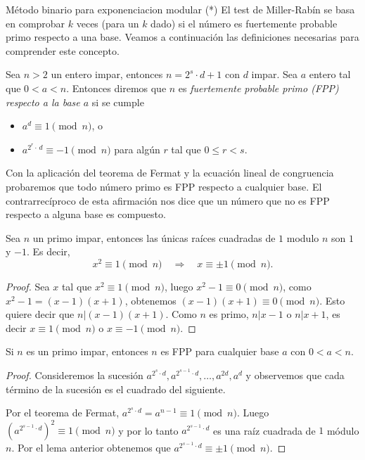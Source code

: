 \begin{section}{Método binario para exponenciacion modular (*)}
El test de  Miller-Rabín se basa en comprobar $k$ veces (para un $k$ dado) si el número es fuertemente probable primo respecto a una base. Veamos a continuación las definiciones necesarias para comprender este concepto. 

\begin{definicion}
    Sea $n > 2$ un entero impar, entonces $n = 2^s \cdot d + 1$ con $d$ impar. Sea $a$ entero  tal que $0 < a < n$. Entonces diremos que $n$ es \textit{fuertemente probable primo (FPP) respecto a la base $a$} si se cumple
    \begin{itemize}
        \item $a^{d} \equiv 1 \pmod{n}$, o
        \item $a^{2^r\cdot\, d} \equiv -1 \pmod{n}$  para algún $r$ tal que $0 \le r < s$.
    \end{itemize}
\end{definicion}

Con la aplicación del teorema de Fermat y la ecuación lineal de congruencia probaremos  que todo número primo es FPP respecto a cualquier base. El contrarrecíproco de esta afirmación nos dice que un número que no es FPP respecto a alguna base es compuesto.

\begin{lema}
    Sea $n$  un primo impar, entonces las únicas raíces cuadradas de $1$ modulo $n$ son $1$ y $-1$. Es decir, 
    $$
    x^2 \equiv 1 \pmod{n}  \quad \Rightarrow\quad x \equiv \pm 1 \pmod{n}.
    $$
\end{lema}
\begin{proof}
    Sea $x$ tal que $x^2 \equiv 1 \pmod{n}$, luego $x^2 - 1 \equiv 0 \pmod{n}$, como $x^2 -1 = (x-1)(x+1)$, obtenemos  $(x-1)(x+1) \equiv 0 \pmod{n}$. Esto quiere decir  que $n|  (x-1)(x+1)$. Como $n$  es primo, $n | x -1$ o $n| x +1$, es decir $x  \equiv 1 \pmod{n}$  o $x  \equiv -1 \pmod{n}$.
\end{proof}

\begin{teorema}
    Si $n$ es un primo impar, entonces $n$ es FPP para cualquier base  $a$ con $0 < a < n$.
\end{teorema}
\begin{proof}
    Consideremos la sucesión $a^{2^s \cdot d}, a^{2^{s-1} \cdot d}, \dots, a^{2d}, a^d$ y  observemos que cada término de la sucesión es el cuadrado del siguiente.

     Por el teorema de Fermat,  $a^{2^s \cdot d} = a^{n-1} \equiv 1 \pmod{n}$. Luego $(a^{2^{s-1} \cdot d})^2 \equiv 1 \pmod{n}$ y por lo tanto $a^{2^{s-1} \cdot d}$ es una raíz cuadrada de $1$ módulo $n$. Por el lema anterior obtenemos  que  $a^{2^{s-1} \cdot d} \equiv \pm 1 \pmod{n}$.


\end{proof}
\end{section}
